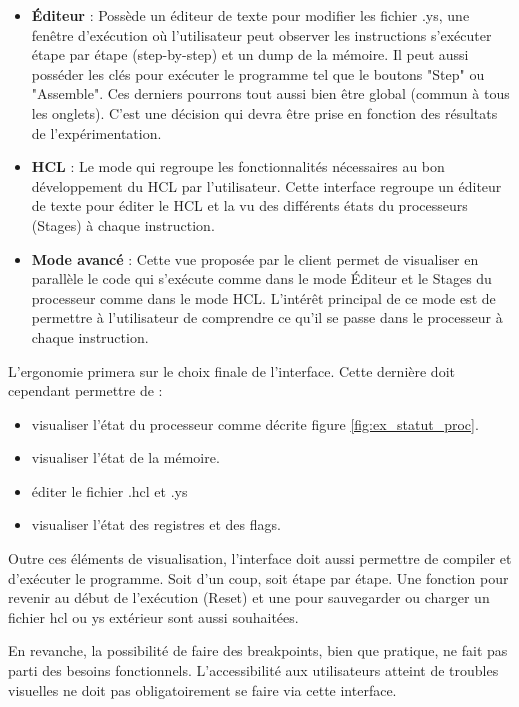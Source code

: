\documentclass[french]{article}
\begin{document}
\begin{itemize}
    \item \textbf{Éditeur} : Possède un éditeur de texte pour modifier les fichier .ys, une fenêtre d'exécution où l'utilisateur peut observer les instructions s'exécuter étape par étape (step-by-step) et un dump de la mémoire.
    Il peut aussi posséder les clés pour exécuter le programme tel que le boutons "Step" ou "Assemble". Ces derniers pourrons tout aussi bien être global (commun à tous les onglets). C'est une décision qui devra être prise en fonction des résultats de l'expérimentation.
    
    \item \textbf{HCL} : Le mode qui regroupe les fonctionnalités nécessaires au bon développement du HCL par l'utilisateur. Cette interface regroupe un éditeur de texte pour éditer le HCL et la vu des différents états du processeurs (Stages) à chaque instruction.
    
    \item \textbf{Mode avancé} : Cette vue proposée par le client permet de visualiser en parallèle le code qui s'exécute comme dans le mode Éditeur et le Stages du processeur comme dans le mode HCL. L'intérêt principal de ce mode est de permettre à l'utilisateur de comprendre ce qu'il se passe dans le processeur à chaque instruction.\\
\end{itemize}

L'ergonomie primera sur le choix finale de l'interface. Cette dernière doit cependant permettre de :

\begin{itemize}
    \item visualiser l'état du processeur comme décrite figure \ref{fig:ex_statut_proc}.
    \item visualiser l'état de la mémoire.
    \item éditer le fichier .hcl et .ys
    \item visualiser l'état des registres et des flags.\\
\end{itemize}

Outre ces éléments de visualisation, l'interface doit aussi permettre de compiler et d'exécuter le programme. Soit d'un coup, soit étape par étape. Une fonction pour revenir au début de l'exécution (Reset) et une pour sauvegarder ou charger un fichier hcl ou ys extérieur sont aussi souhaitées.

En revanche, la possibilité de faire des breakpoints, bien que pratique, ne fait pas parti des besoins fonctionnels. L'accessibilité aux utilisateurs atteint de troubles visuelles ne doit pas obligatoirement se faire via cette interface.
\end{document}
